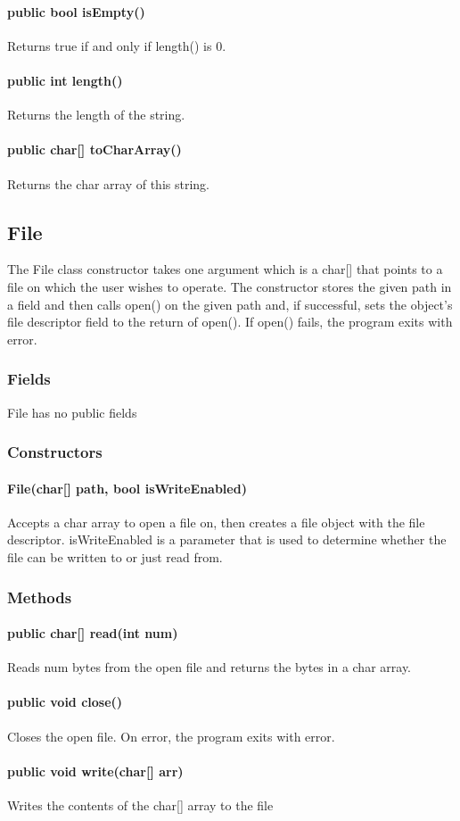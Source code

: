 \begin{homeworkProblem}
	\paragraph{public bool isEmpty()}
	Returns true if and only if length() is 0.
	\paragraph{public int length()}
	Returns the length of the string.
	\paragraph{public char[] toCharArray()}
	Returns the char array of this string.

	\subsection{File}
	The File class constructor takes one argument which is a char[] that points to a file on which the user wishes to operate. The constructor stores the given path in a field and then calls open() on the given path and, if successful, sets the object’s file descriptor field to the return of open(). If open() fails, the program exits with error.
	\subsubsection{Fields}
	File has no public fields

	\subsubsection{Constructors}
	\paragraph{File(char[] path, bool isWriteEnabled)}
	Accepts a char array to open a file on, then creates a file object with the file descriptor. isWriteEnabled is a parameter that is used to determine whether the file can be written to or just read from.

	\subsubsection{Methods}
	\paragraph{public char[] read(int num)}
	Reads num bytes from the open file and returns the bytes in a char array.
	\paragraph{public void close()}
	Closes the open file. On error, the program exits with error.
	\paragraph{public void write(char[] arr)}
	Writes the contents of the char[] array to the file

\end{homeworkProblem}
